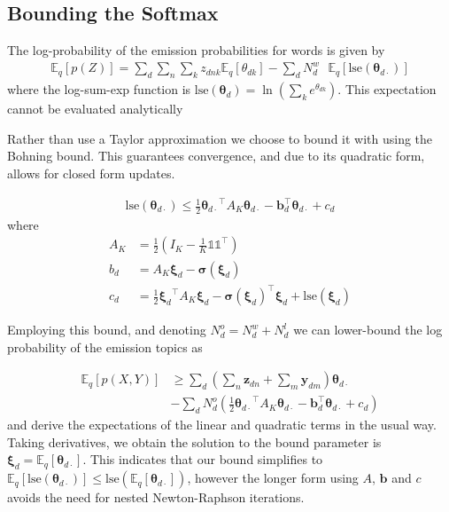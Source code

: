 \documentclass{sciposter}
\newcommand \ex[2] {
    \mathbb{E}_{ { #2 } }\left[ #1 \right]
}
\newcommand \halve[1] {
	\frac{#1}{2}
}
\newcommand \half {
    \halve{1}
}
\newcommand \T { ^\top }
\newcommand \vv[1] { \bm #1 }
\newcommand \Ed {{ \vv{\xi}_d}}
\newcommand \zdnk[0] { { z_{dnk} } }
\newcommand \thd[0]  { { \vv \theta_d } }
\newcommand \thdk[0] { { \theta_{dk} } }
\newcommand \one  {{  \mathds{1} }}
\newcommand \lse { \text{lse} }
\newcommand \thdo { { \vv{\theta}_{d\cdot} } }
\begin{document}
\begin{multicols}{3}
\section{Bounding the Softmax}
The log-probability of the emission probabilities for words is given by
\begin{align*}
\ex{p(Z)}{q} = \sum_d \sum_n \sum_k \zdnk \ex{\thdk}{q} - \sum_d N^w_d \text{ }\ex{\lse(\thdo)}{q}
\end{align*}
where the log-sum-exp function is $\lse(\thd) = \ln (\sum_k e^\thdk)$. This expectation cannot be evaluated analytically

Rather than use a Taylor approximation\cite{Wang2013} we choose to bound it with using the Bohning bound\cite{Bohning1988}. This guarantees convergence, and due to its quadratic form, allows for closed form updates.

\begin{align*}
\lse(\thdo) \leq \half \thdo\T A_K \thdo - \vv{b}_d\T\thdo + c_d \label{eqn:lse-def}
\end{align*}
where
\begin{align*}
A_K & = \half \left( I_K - \frac{1}{K} \one \one\T \right) \\
b_d & = A_K \Ed - \vv{\sigma}(\Ed)  \\
c_d & = \frac{1}{2} \Ed\T A_K \Ed - \vv{\sigma}(\Ed)\T\Ed + \lse(\Ed)
\end{align*}

Employing this bound, and denoting $N^o_d = N^w_d + N^l_d$ we can lower-bound the log probability of the emission topics as

\begin{equation*}
\begin{aligned}
\ex{p(X,Y)}{q} & \geq \sum_d  (\sum_n \vv{z}_{dn} + \sum_m \vv{y}_{dm}) \thdo \\
   & - \sum_d N^o_d \left(\half \thdo\T A_K \thdo - \vv{b}_d\T\thdo + c_d\right)
\end{aligned}
\end{equation*}
and derive the expectations of the linear and quadratic terms in the usual way.\\

Taking derivatives, we obtain the solution to the bound parameter is $\Ed = \ex{\thdo}{q}$. This indicates that our bound simplifies to $\ex{\lse(\thdo)}{q} \leq \lse(\ex{\thdo}{q})$, however the longer form using $A$, $\vv{b}$ and $c$ avoids the need for nested Newton-Raphson iterations.\\


\end{multicols}
\end{document}
